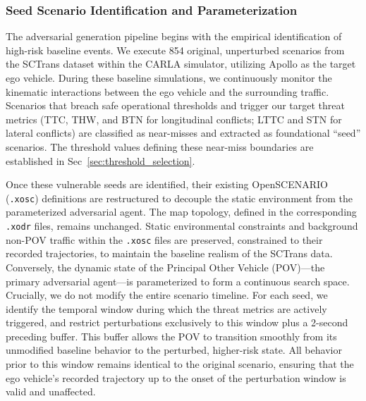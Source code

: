 \subsubsection{Seed Scenario Identification and Parameterization}\label{sec:seed}


The adversarial generation pipeline begins with the empirical identification of high-risk baseline events. We execute 854 original, unperturbed scenarios from the SCTrans dataset within the CARLA simulator, utilizing Apollo as the target ego vehicle. During these baseline simulations, we continuously monitor the kinematic interactions between the ego vehicle and the surrounding traffic. Scenarios that breach safe operational thresholds and trigger our target threat metrics (TTC, THW, and BTN for longitudinal conflicts; LTTC and STN for lateral conflicts) are classified as near-misses and extracted as foundational ``seed'' scenarios. The threshold values defining these near-miss boundaries are established in Sec~\ref{sec:threshold_selection}.

Once these vulnerable seeds are identified, their existing OpenSCENARIO (\texttt{.xosc}) definitions are restructured to decouple the static environment from the parameterized adversarial agent. The map topology, defined in the corresponding \texttt{.xodr} files, remains unchanged. Static environmental constraints and background non-POV traffic within the \texttt{.xosc} files are preserved, constrained to their recorded trajectories, to maintain the baseline realism of the SCTrans data. Conversely, the dynamic state of the Principal Other Vehicle (POV)---the primary adversarial agent---is parameterized to form a continuous search space. Crucially, we do not modify the entire scenario timeline. For each seed, we identify the temporal window during which the threat metrics are actively triggered, and restrict perturbations exclusively to this window plus a 2-second preceding buffer. This buffer allows the POV to transition smoothly from its unmodified baseline behavior to the perturbed, higher-risk state. All behavior prior to this window remains identical to the original scenario, ensuring that the ego vehicle's recorded trajectory up to the onset of the perturbation window is valid and unaffected.

